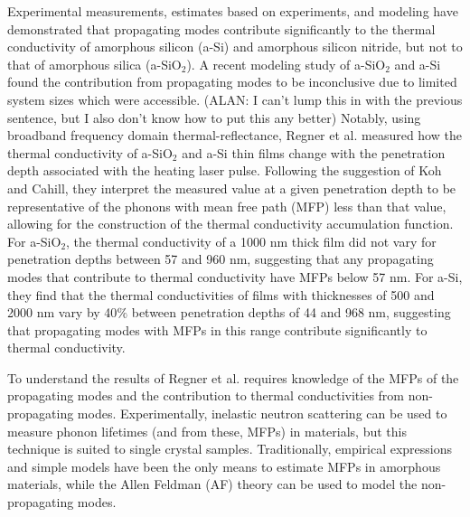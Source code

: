 \documentclass[aps,prb,onecolumn,preprint,superscriptaddress,footinbib,amsmath,amssymb,floatfix]{revtex4}
\begin{document}
Experimental measurements, estimates based on experiments, 
and modeling have demonstrated that propagating modes contribute
significantly to the thermal conductivity of amorphous silicon (a-Si)
\cite{feldman_thermal_1993,cahill_thermal_1994,
feldman_numerical_1999,liu_high_2009,yang_anomalously_2010,
he_heat_2011,regner_broadband_2013} 
and amorphous silicon nitride,
\cite{sultan_heat_2013} but not to that of 
amorphous silica (a-SiO$_2$).
\cite{love_estimate_1990,lee_heat_1997,baldi_thermal_2008,
regner_broadband_2013} A recent modeling study of 
a-SiO$_2$ and a-Si found the 
contribution from propagating modes to be inconclusive due to 
limited system sizes which were accessible.
\cite{shenogin_predicting_2009} (ALAN: I can't lump this in with 
the previous sentence, but I also don't know how to put this any 
better) 
Notably, using broadband frequency domain thermal-reflectance, 
Regner et al. measured how the thermal conductivity of a-SiO$_2$ and 
a-Si thin films change with the penetration depth associated with the 
heating laser pulse.\cite{regner_broadband_2013} 
Following the suggestion of Koh and Cahill, they interpret the 
measured value at a given penetration depth to be representative 
of the phonons with mean free path (MFP) less than that value, 
allowing for the 
construction of the thermal conductivity accumulation 
function.\cite{dames_thermal_2005,minnich_thermal_2011,
yang_mean_2013} 
For a-SiO$_2$, the thermal conductivity of a 1000 nm thick 
film did not vary for penetration depths between 57 and 960 nm, 
suggesting that any propagating modes that contribute to thermal 
conductivity have MFPs below 57 nm. For a-Si, they find that the 
thermal conductivities of films with thicknesses of 500 and 2000 nm 
vary by 
40$\%$ between penetration depths of 44 and 968 nm, suggesting 
that propagating modes with MFPs in this range contribute 
significantly to thermal conductivity.\cite{regner_broadband_2013}  

To understand the results of Regner et al. requires knowledge of 
the MFPs of the 
propagating modes and the contribution to thermal conductivities 
from non-propagating modes. 
Experimentally, inelastic neutron scattering can be 
used to measure phonon lifetimes (and from these, MFPs) in materials,
but this technique is suited to single crystal samples.
\cite{christianson_phonon_2008} 
Traditionally, empirical expressions and
simple models have been the only means
to estimate MFPs in amorphous materials,
\cite{zeller_thermal_1971,graebner_phonon_1986,
freeman_thermal_1986,cahill_lattice_1988,cahill_heat_1989} 
while the Allen Feldman (AF) theory can be used to model the 
non-propagating modes.\cite{allen_thermal_1993,feldman_thermal_1993}
\end{document}
